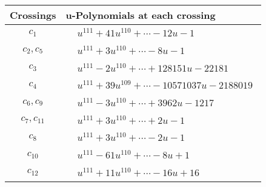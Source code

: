 \documentclass[1p]{elsarticle_modified}
\theoremstyle{definition}
\begin{document}
\begin{tabular}{m{50pt}|m{274pt}}
Crossings & \hspace{64pt}u-Polynomials at each crossing \\
\hline $$\begin{aligned}c_{1}\end{aligned}$$&$\begin{aligned}
&u^{111}+41 u^{110}+\cdots-12 u-1
\end{aligned}$\\
\hline $$\begin{aligned}c_{2},c_{5}\end{aligned}$$&$\begin{aligned}
&u^{111}+3 u^{110}+\cdots-8 u-1
\end{aligned}$\\
\hline $$\begin{aligned}c_{3}\end{aligned}$$&$\begin{aligned}
&u^{111}-2 u^{110}+\cdots+128151 u-22181
\end{aligned}$\\
\hline $$\begin{aligned}c_{4}\end{aligned}$$&$\begin{aligned}
&u^{111}+39 u^{109}+\cdots-10571037 u-2188019
\end{aligned}$\\
\hline $$\begin{aligned}c_{6},c_{9}\end{aligned}$$&$\begin{aligned}
&u^{111}-3 u^{110}+\cdots+3962 u-1217
\end{aligned}$\\
\hline $$\begin{aligned}c_{7},c_{11}\end{aligned}$$&$\begin{aligned}
&u^{111}+3 u^{110}+\cdots+2 u-1
\end{aligned}$\\
\hline $$\begin{aligned}c_{8}\end{aligned}$$&$\begin{aligned}
&u^{111}+3 u^{110}+\cdots-2 u-1
\end{aligned}$\\
\hline $$\begin{aligned}c_{10}\end{aligned}$$&$\begin{aligned}
&u^{111}-61 u^{110}+\cdots-8 u+1
\end{aligned}$\\
\hline $$\begin{aligned}c_{12}\end{aligned}$$&$\begin{aligned}
&u^{111}+11 u^{110}+\cdots-16 u+16
\end{aligned}$\\
\hline
\end{tabular}\\~\\
\end{document}
